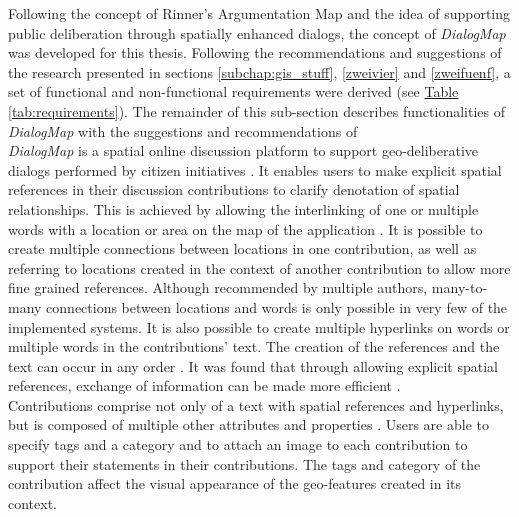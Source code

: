 Following the concept of Rinner's Argumentation Map \cite{Rinner_ArgumentationMaps} and the idea of supporting public deliberation through spatially enhanced dialogs, the concept of \textit{DialogMap} was developed for this thesis. Following the recommendations and suggestions of the research presented in sections \ref{subchap:gis_stuff}, \ref{zweivier} and \ref{zweifuenf}, a set of functional and non-functional requirements were derived (see \hyperref[tab:requirements]{Table \ref{tab:requirements}}). The remainder of this sub-section describes functionalities of \textit{DialogMap} with the suggestions and recommendations of\\
\textit{DialogMap} is a spatial online discussion platform to support geo-deliberative dialogs performed by citizen initiatives \cite{Cai2009_spatial_annotation_deliberation}  . It enables users to make explicit spatial references in their discussion contributions to clarify denotation of spatial relationships. This is achieved by allowing the interlinking of one or multiple words with a location or area on the map of the application \cite{Rinner_ArgumentationMaps}. It is possible to create multiple connections between locations in one contribution, as well as referring to locations created in the context of another contribution to allow more fine grained references. Although recommended by multiple authors, many-to-many connections between locations and words is only possible in very few \cite{Kessler2005_ArgumentationMapPrototype,Voss2004_Evolution_PGIS,you2009_participatory_map_based,Cai2009_spatial_annotation_deliberation} of the implemented systems. It is also possible to create multiple hyperlinks on words or multiple words in the contributions' text. The creation of the references and the text can occur in any order \cite{Voss2004_Evolution_PGIS}. It was found that through allowing explicit spatial references, exchange of information can be made more efficient \cite{Cherubini2007_shared_maps}. \\
Contributions comprise not only of a text with spatial references and hyperlinks, but is composed of multiple other attributes and properties \cite{Longueville2010_community_based_geoportals_web20,Kessler2005_ArgumentationMapPrototype,Kessler2005_Conflict_Resolution}. Users are able to specify tags and a category and to attach an image to each contribution \cite{Tang2005_PPGIS_discussion_forum,zhao2006geodf,you2009_participatory_map_based,Cai2009_spatial_annotation_deliberation} to support their statements in their contributions. The tags and category of the contribution affect the visual appearance of the geo-features created in its context.\\
